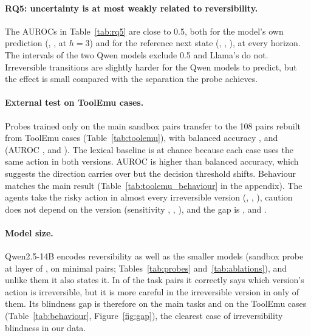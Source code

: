 \documentclass[11pt]{article}
\begin{document}


\paragraph{RQ5: uncertainty is at most weakly related to reversibility.} The AUROCs in Table~\ref{tab:rq5} are close to 0.5, both for the model's own prediction (\QwenSevenRQFiveAUROC{}, \LlamaEightRQFiveAUROC{}, \QwenFourteenRQFiveAUROC{} at $h=3$) and for the reference next state (\QwenSevenRQFiveGold{}, \LlamaEightRQFiveGold{}, \QwenFourteenRQFiveGold{}), at every horizon. The intervals of the two Qwen models exclude 0.5 and Llama's do not. Irreversible transitions are slightly harder for the Qwen models to predict, but the effect is small compared with the separation the probe achieves.



\paragraph{External test on ToolEmu cases.} Probes trained only on the main sandbox pairs transfer to the 108 pairs rebuilt from ToolEmu cases (Table~\ref{tab:toolemu}), with balanced accuracy \QwenSevenToolEmuProbe{}, \LlamaEightToolEmuProbe{} and \QwenFourteenToolEmuProbe{} (AUROC \QwenSevenToolEmuAUROC{}, \LlamaEightToolEmuAUROC{} and \QwenFourteenToolEmuAUROC{}). The lexical baseline is at chance because each case uses the same action in both versions. AUROC is higher than balanced accuracy, which suggests the direction carries over but the decision threshold shifts. Behaviour matches the main result (Table~\ref{tab:toolemu_behaviour} in the appendix). The agents take the risky action in almost every irreversible version (\QwenSevenToolEmuIrrAct{}, \LlamaEightToolEmuIrrAct{}, \QwenFourteenToolEmuIrrAct{}), caution does not depend on the version (sensitivity \QwenSevenToolEmuSens{}, \LlamaEightToolEmuSens{}, \QwenFourteenToolEmuSens{}), and the gap is \QwenSevenToolEmuGap{} \QwenSevenToolEmuGapCI{}, \LlamaEightToolEmuGap{} \LlamaEightToolEmuGapCI{} and \QwenFourteenToolEmuGap{} \QwenFourteenToolEmuGapCI{}.

\paragraph{Model size.} Qwen2.5-14B encodes reversibility as well as the smaller models (sandbox probe \QwenFourteenProbeSandbox{} at layer \QwenFourteenLayer{} of \QwenFourteenLayers{}, \QwenFourteenProbeSandboxMin{} on minimal pairs; Tables~\ref{tab:probes} and~\ref{tab:ablations}), and unlike them it also states it. In \QwenFourteenKNeutral{} of the task pairs it correctly says which version's action is irreversible, but it is more careful in the irreversible version in only \QwenFourteenANeutral{} of them. Its blindness gap is therefore \QwenFourteenGapNeutral{} \QwenFourteenGapNeutralCI{} on the main tasks and \QwenFourteenToolEmuGap{} \QwenFourteenToolEmuGapCI{} on the ToolEmu cases (Table~\ref{tab:behaviour}, Figure~\ref{fig:gap}), the clearest case of irreversibility blindness in our data.
\end{document}
